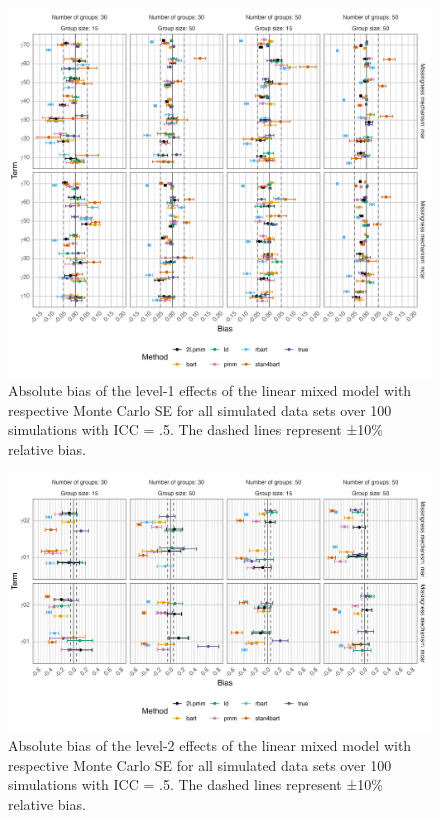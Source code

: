 \documentclass[10pt, a4paper, titlepage]{article}
\begin{document}
\begin{figure}[H]
    \centering 
    \includegraphics[width=1\textwidth]{biaslevel1.png}
    \caption{Absolute bias of the level-1 effects of the linear mixed model with respective Monte Carlo SE for all simulated data sets over 100 simulations with ICC = .5. The dashed lines represent ±10\% relative bias.}
    \label{fig:biaslevel1}
\end{figure}

\begin{figure}[H]
    \centering
    \includegraphics[width=1\textwidth]{biaslevel2.png}
    \caption{Absolute bias of the level-2 effects of the linear mixed model with respective Monte Carlo SE for all simulated data sets over 100 simulations with ICC = .5. The dashed lines represent ±10\% relative bias.}
    \label{fig:biaslevel2}
\end{figure}
\end{document}
